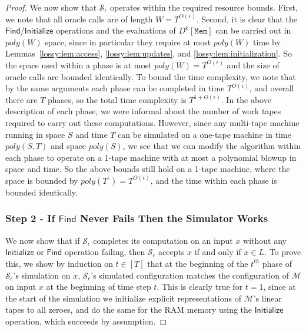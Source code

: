 \begin{proof}
We now show that $\mathcal{S}_{\epsilon}$ operates within the required resource bounds. First, we note that all oracle calls are of length $W = T^{O(\epsilon)}$. Second, it is clear that the $\mathsf{Find}$/$\mathsf{Initialize}$ operations and the evaluations of $D^k[\mathtt{Mem}]$ can be carried out in $poly(W)$ space, since in particular they require at most $poly(W)$ time by Lemmas~\ref{lossy:lem:access}, \ref{lossy:lem:updates}, and \ref{lossy:lem:initialization}. So the space used within a phase is at most $poly(W) = T^{O(\epsilon)}$ and the size of oracle calls are bounded identically. To bound the time complexity, we note that by the same arguments each phase can be completed in time $T^{O(\epsilon)}$, and overall there are $T$ phases, so the total time complexity is $T^{1 + O(\epsilon)}$. In the above description of each phase, we were informal about the number of work tapes required to carry out these computations. However, since any multi-tape machine running in space $S$ and time $T$ can be simulated on a one-tape machine in time $poly(S,T)$ and space $poly(S)$, we see that we can modify the algorithm within each phase to operate on a 1-tape machine with at most a polynomial blowup in space and time. So the above bounds still hold on a 1-tape machine, where the space is bounded by $poly(T^{\epsilon})= T^{O(\epsilon)}$, and the time within each phase is bounded identically.

\subsubsection*{Step 2 - If $\mathsf{Find}$ Never Fails Then the Simulator Works}
We now show that if $\mathcal{S}_{\epsilon}$ completes its computation on an input $x$ without any $\mathsf{Initialize}$ or $\mathsf{Find}$ operation failing, then $\mathcal{S}_{\epsilon}$ accepts $x$ if and only if $x \in L$. To prove this, we show by induction on $t \in [T]$ that at the beginning of the $t^{th}$ phase of $\mathcal{S}_{\epsilon}$'s simulation on $x$, $\mathcal{S}_{\epsilon}$'s simulated configuration matches the configuration of $\mathcal{M}$ on input $x$ at the beginning of time step $t$. This is clearly true for $t = 1$, since at the start of the simulation we initialize explicit representations of $\mathcal{M}$'s linear tapes to all zeroes, and do the same for the RAM memory using the $\mathsf{Initialize}$ operation, which succeeds by assumption.


\end{proof}
